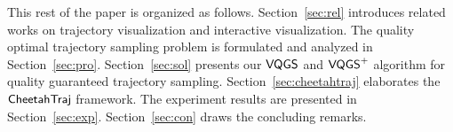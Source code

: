 \squishend


This rest of the paper is organized as follows. Section~\ref{sec:rel} introduces related works on trajectory visualization and interactive visualization. The quality optimal trajectory sampling problem is formulated and analyzed in Section~\ref{sec:pro}. Section~\ref{sec:sol} presents our $\mathsf{VQGS}$ and $\mathsf{VQGS}^+$ algorithm for quality guaranteed trajectory sampling. Section~\ref{sec:cheetahtraj} elaborates the $\mathsf{CheetahTraj}$ framework. The experiment results are presented in Section~\ref{sec:exp}. Section~\ref{sec:con} draws the concluding remarks.





%



